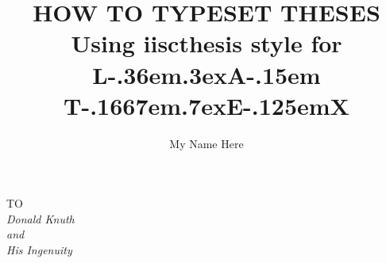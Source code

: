 
\pagestyle{bfheadings}




\begin{frontmatter}
%
%

\title{HOW TO TYPESET THESES\\ 
	Using iiscthesis style for %
	{\LARGE {\rm L\kern-.36em\raise.3ex\hbox{\large A}\kern-.15em
	    T\kern-.1667em\lower.7ex\hbox{E}\kern-.125emX}}\\
	}
\author{My Name Here}
\enggfaculty
\iisclogotrue %
\tablespagetrue %
\maketitle
\begin{dedication}
\begin{center}
TO \\[2em]
\large\it Donald Knuth\\
and\\
\large\it His Ingenuity 
\end{center}
\end{dedication}
\acknowledgements


\end{frontmatter}
